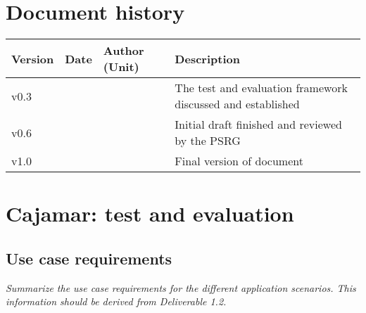 \documentclass[11pt, oneside]{article}   	%
\numberwithin{figure}{section}
\numberwithin{equation}{section}
\numberwithin{table}{section}
\begin{document}
%
%

%

\tableofcontents

\newpage


\section*{Document history}

\begin{table}[htbp]
  \centering
  \begin{tabularx}{\linewidth}{|p{13mm}| p{18mm}| X | X |} \hline
    {\bf Version} & {\bf Date} & {\bf Author (Unit)} & {\bf Description} \\ \hline
    v0.3 &  &  & The test and evaluation framework discussed and established \\ \hline
    v0.6 &  &  & Initial draft finished and reviewed by the PSRG  \\ \hline
    v1.0 &  & & Final version of document  \\ \hline
  \end{tabularx}
\end{table}

\newpage

%








\section{Cajamar: test and evaluation}

\subsection{Use case requirements}

\emph{Summarize the use case requirements for the different application scenarios. This information should be
  derived from Deliverable 1.2.}
\end{document}
